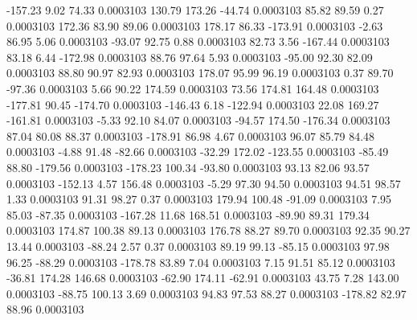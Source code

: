      -157.23        9.02       74.33     0.0003103
      130.79      173.26      -44.74     0.0003103
       85.82       89.59        0.27     0.0003103
      172.36       83.90       89.06     0.0003103
      178.17       86.33     -173.91     0.0003103
       -2.63       86.95        5.06     0.0003103
      -93.07       92.75        0.88     0.0003103
       82.73        3.56     -167.44     0.0003103
       83.18        6.44     -172.98     0.0003103
       88.76       97.64        5.93     0.0003103
      -95.00       92.30       82.09     0.0003103
       88.80       90.97       82.93     0.0003103
      178.07       95.99       96.19     0.0003103
        0.37       89.70      -97.36     0.0003103
        5.66       90.22      174.59     0.0003103
       73.56      174.81      164.48     0.0003103
     -177.81       90.45     -174.70     0.0003103
     -146.43        6.18     -122.94     0.0003103
       22.08      169.27     -161.81     0.0003103
       -5.33       92.10       84.07     0.0003103
      -94.57      174.50     -176.34     0.0003103
       87.04       80.08       88.37     0.0003103
     -178.91       86.98        4.67     0.0003103
       96.07       85.79       84.48     0.0003103
       -4.88       91.48      -82.66     0.0003103
      -32.29      172.02     -123.55     0.0003103
      -85.49       88.80     -179.56     0.0003103
     -178.23      100.34      -93.80     0.0003103
       93.13       82.06       93.57     0.0003103
     -152.13        4.57      156.48     0.0003103
       -5.29       97.30       94.50     0.0003103
       94.51       98.57        1.33     0.0003103
       91.31       98.27        0.37     0.0003103
      179.94      100.48      -91.09     0.0003103
        7.95       85.03      -87.35     0.0003103
     -167.28       11.68      168.51     0.0003103
      -89.90       89.31      179.34     0.0003103
      174.87      100.38       89.13     0.0003103
      176.78       88.27       89.70     0.0003103
       92.35       90.27       13.44     0.0003103
      -88.24        2.57        0.37     0.0003103
       89.19       99.13      -85.15     0.0003103
       97.98       96.25      -88.29     0.0003103
     -178.78       83.89        7.04     0.0003103
        7.15       91.51       85.12     0.0003103
      -36.81      174.28      146.68     0.0003103
      -62.90      174.11      -62.91     0.0003103
       43.75        7.28      143.00     0.0003103
      -88.75      100.13        3.69     0.0003103
       94.83       97.53       88.27     0.0003103
     -178.82       82.97       88.96     0.0003103
